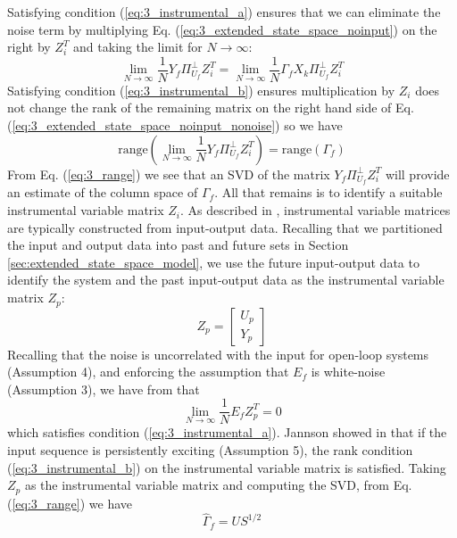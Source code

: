 Satisfying condition (\ref{eq:3_instrumental_a}) ensures that we can eliminate the noise term by multiplying Eq. (\ref{eq:3_extended_state_space_noinput}) on the right by $Z_i^T$ and taking the limit for $N\rightarrow\infty$:
\begin{equation}\label{eq:3_extended_state_space_noinput_nonoise}
\lim_{N\rightarrow\infty} \frac{1}{N}Y_f\Pi_{U_f}^\perp Z_i^T = \lim_{N\rightarrow\infty} \frac{1}{N}\Gamma_f X_k\Pi_{U_f}^\perp Z_i^T
\end{equation}
 Satisfying condition (\ref{eq:3_instrumental_b}) ensures multiplication by $Z_i$ does not change the rank of the remaining matrix on the right hand side of Eq. (\ref{eq:3_extended_state_space_noinput_nonoise}) so we have
\begin{equation}\label{eq:3_range}
\mbox{range}\left(\lim_{N\rightarrow\infty} \frac{1}{N} Y_f\Pi_{U_f}^\perp Z_i^T\right) = \mbox{range}\left(\Gamma_f\right)
\end{equation}
From Eq. (\ref{eq:3_range}) we see that an SVD of the matrix $Y_f\Pi_{U_f}^\perp Z_i^T$  will provide an estimate of the column space of $\Gamma_f$. All that remains is to identify a suitable instrumental variable matrix $Z_i$. As described in \cite{soderstrom1983instrumental, verhaegen2007filtering}, instrumental variable matrices are typically constructed from input-output data. Recalling that we partitioned the input and output data into past and future sets in Section \ref{sec:extended_state_space_model}, we use the future input-output data to identify the system and the past input-output data as the instrumental variable matrix $Z_p$:
\begin{equation*}
Z_p = \begin{bmatrix}U_p\\ Y_p\end{bmatrix}
\end{equation*}
Recalling that the noise is uncorrelated with the input for open-loop systems (Assumption 4), and enforcing the assumption that $E_f$ is white-noise (Assumption 3), we have from \cite{verhaegen2007filtering} that 
\begin{equation*}
\lim_{N\rightarrow\infty} \frac{1}{N} E_f Z_p^T = 0
\end{equation*}
which satisfies condition (\ref{eq:3_instrumental_a}). Jannson showed in \cite{jansson1997subspace} that if the input sequence is persistently exciting (Assumption 5), the rank condition (\ref{eq:3_instrumental_b}) on the instrumental variable matrix is satisfied. Taking $Z_p$ as the instrumental variable matrix and computing the SVD, from Eq. (\ref{eq:3_range}) we have
\begin{equation}
\hat{\Gamma}_f = U {S}^{1/2}
\end{equation}


